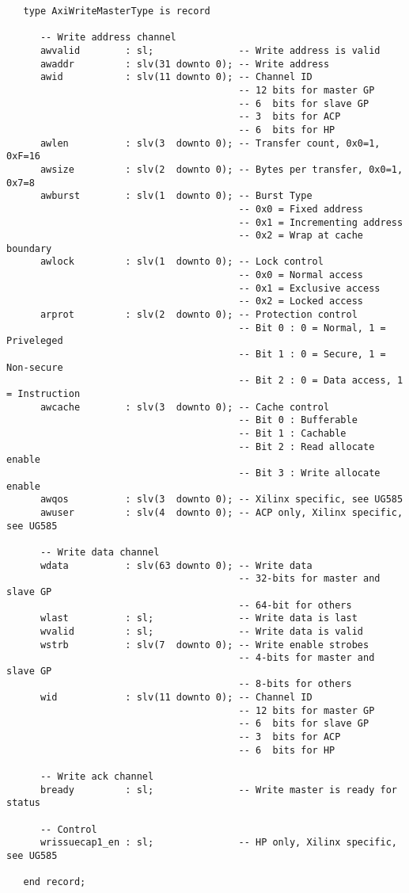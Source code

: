 \documentclass[11pt]{article}
\begin{document}
\small
\begin{verbatim}
   type AxiWriteMasterType is record

      -- Write address channel
      awvalid        : sl;               -- Write address is valid
      awaddr         : slv(31 downto 0); -- Write address
      awid           : slv(11 downto 0); -- Channel ID
                                         -- 12 bits for master GP
                                         -- 6  bits for slave GP
                                         -- 3  bits for ACP
                                         -- 6  bits for HP
      awlen          : slv(3  downto 0); -- Transfer count, 0x0=1, 0xF=16
      awsize         : slv(2  downto 0); -- Bytes per transfer, 0x0=1, 0x7=8
      awburst        : slv(1  downto 0); -- Burst Type
                                         -- 0x0 = Fixed address
                                         -- 0x1 = Incrementing address
                                         -- 0x2 = Wrap at cache boundary
      awlock         : slv(1  downto 0); -- Lock control
                                         -- 0x0 = Normal access
                                         -- 0x1 = Exclusive access
                                         -- 0x2 = Locked access
      arprot         : slv(2  downto 0); -- Protection control
                                         -- Bit 0 : 0 = Normal, 1 = Priveleged
                                         -- Bit 1 : 0 = Secure, 1 = Non-secure
                                         -- Bit 2 : 0 = Data access, 1 = Instruction
      awcache        : slv(3  downto 0); -- Cache control
                                         -- Bit 0 : Bufferable
                                         -- Bit 1 : Cachable  
                                         -- Bit 2 : Read allocate enable
                                         -- Bit 3 : Write allocate enable
      awqos          : slv(3  downto 0); -- Xilinx specific, see UG585
      awuser         : slv(4  downto 0); -- ACP only, Xilinx specific, see UG585

      -- Write data channel
      wdata          : slv(63 downto 0); -- Write data
                                         -- 32-bits for master and slave GP
                                         -- 64-bit for others
      wlast          : sl;               -- Write data is last
      wvalid         : sl;               -- Write data is valid
      wstrb          : slv(7  downto 0); -- Write enable strobes
                                         -- 4-bits for master and slave GP
                                         -- 8-bits for others
      wid            : slv(11 downto 0); -- Channel ID
                                         -- 12 bits for master GP
                                         -- 6  bits for slave GP
                                         -- 3  bits for ACP
                                         -- 6  bits for HP

      -- Write ack channel
      bready         : sl;               -- Write master is ready for status

      -- Control
      wrissuecap1_en : sl;               -- HP only, Xilinx specific, see UG585  

   end record;
\end{verbatim}
\end{document}
